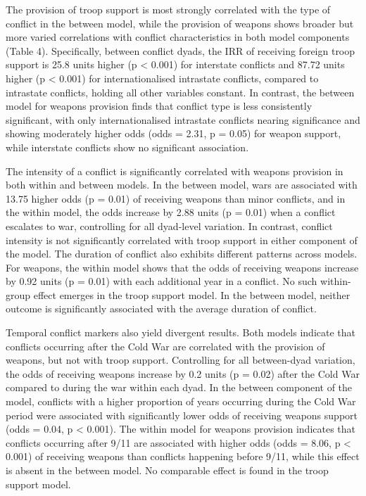 \documentclass[
]{article}
\begin{document}
The provision of troop support is most strongly correlated with the type
of conflict in the between model, while the provision of weapons shows
broader but more varied correlations with conflict characteristics in
both model components (Table 4). Specifically, between conflict dyads,
the IRR of receiving foreign troop support is 25.8 units higher (p
\textless{} 0.001) for interstate conflicts and 87.72 units higher (p
\textless{} 0.001) for internationalised intrastate conflicts, compared
to intrastate conflicts, holding all other variables constant. In
contrast, the between model for weapons provision finds that conflict
type is less consistently significant, with only internationalised
intrastate conflicts nearing significance and showing moderately higher
odds (odds = 2.31, p = 0.05) for weapon support, while interstate
conflicts show no significant association.

The intensity of a conflict is significantly correlated with weapons
provision in both within and between models. In the between model, wars
are associated with 13.75 higher odds (p = 0.01) of receiving weapons
than minor conflicts, and in the within model, the odds increase by 2.88
units (p = 0.01) when a conflict escalates to war, controlling for all
dyad-level variation. In contrast, conflict intensity is not
significantly correlated with troop support in either component of the
model. The duration of conflict also exhibits different patterns across
models. For weapons, the within model shows that the odds of receiving
weapons increase by 0.92 units (p = 0.01) with each additional year in a
conflict. No such within-group effect emerges in the troop support
model. In the between model, neither outcome is significantly associated
with the average duration of conflict.

Temporal conflict markers also yield divergent results. Both models
indicate that conflicts occurring after the Cold War are correlated with
the provision of weapons, but not with troop support. Controlling for
all between-dyad variation, the odds of receiving weapons increase by
0.2 units (p = 0.02) after the Cold War compared to during the war
within each dyad. In the between component of the model, conflicts with
a higher proportion of years occurring during the Cold War period were
associated with significantly lower odds of receiving weapons support
(odds = 0.04, p \textless{} 0.001). The within model for weapons
provision indicates that conflicts occurring after 9/11 are associated
with higher odds (odds = 8.06, p \textless{} 0.001) of receiving weapons
than conflicts happening before 9/11, while this effect is absent in the
between model. No comparable effect is found in the troop support model.
\end{document}
